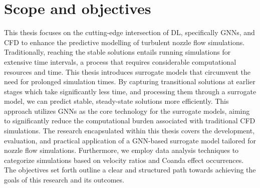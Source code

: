 \section{Scope and objectives}
This thesis focuses on the cutting-edge intersection of DL, specifically GNNs, and CFD to enhance the predictive modelling of turbulent nozzle flow simulations. Traditionally, reaching the stable solutions entails running simulations for extensive time intervals, a process that requires considerable computational resources and time. This thesis introduces surrogate models that circumvent the need for prolonged simulation times. By capturing transitional solutions at earlier stages which take significantly less time, and processing them through a surrogate model, we can predict stable, steady-state solutions more efficiently. This approach utilizes GNNs as the core technology for the surrogate models, aiming to significantly reduce the computational burden associated with traditional CFD simulations. The research encapsulated within this thesis covers the development, evaluation, and practical application of a GNN-based surrogate model tailored for nozzle flow simulations. Furthermore, we employ data analysis techniques to categorize simulations based on velocity ratios and Coanda effect occurrences. The objectives set forth outline a clear and structured path towards achieving the goals of this research and its outcomes.
